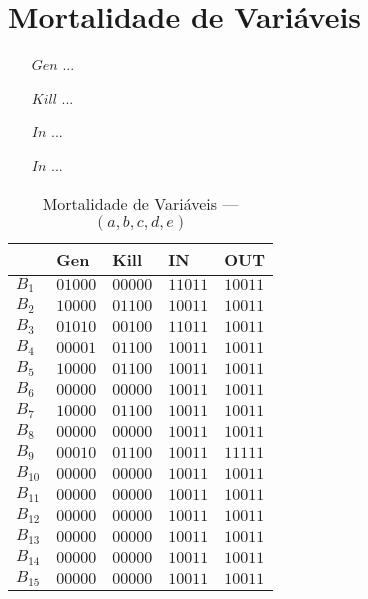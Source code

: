 \section{Mortalidade de Vari\'aveis}

\begin{itemize}
  \item[$Gen$] ...
  \item[$Kill$] ...
  \item[$In$] ...
  \item[$In$] ...
\end{itemize}

\begin{table}[ht]
\centering
\begin{tabular}{l|l|l|l|l}
	& Gen & Kill & IN & OUT\\
\hline
$B_{1}$ &  $01000$ & $00000$ & $11011$ & $10011$\\
$B_{2}$ &  $10000$ & $01100$ & $10011$ & $10011$\\
$B_{3}$ &  $01010$ & $00100$ & $11011$ & $10011$\\
$B_{4}$ &  $00001$ & $01100$ & $10011$ & $10011$\\
$B_{5}$ &  $10000$ & $01100$ & $10011$ & $10011$\\
$B_{6}$ &  $00000$ & $00000$ & $10011$ & $10011$\\
$B_{7}$ &  $10000$ & $01100$ & $10011$ & $10011$\\
$B_{8}$ &  $00000$ & $00000$ & $10011$ & $10011$\\
$B_{9}$ &  $00010$ & $01100$ & $10011$ & $11111$\\
$B_{10}$ &  $00000$ & $00000$ & $10011$ & $10011$\\
$B_{11}$ &  $00000$ & $00000$ & $10011$ & $10011$\\
$B_{12}$ &  $00000$ & $00000$ & $10011$ & $10011$\\
$B_{13}$ &  $00000$ & $00000$ & $10011$ & $10011$\\
$B_{14}$ &  $00000$ & $00000$ & $10011$ & $10011$\\
$B_{15}$ &  $00000$ & $00000$ & $10011$ & $10011$\\
\end{tabular}
\caption{Mortalidade de Vari\'aveis --- $(a, b, c, d, e)$}
\end{table}

